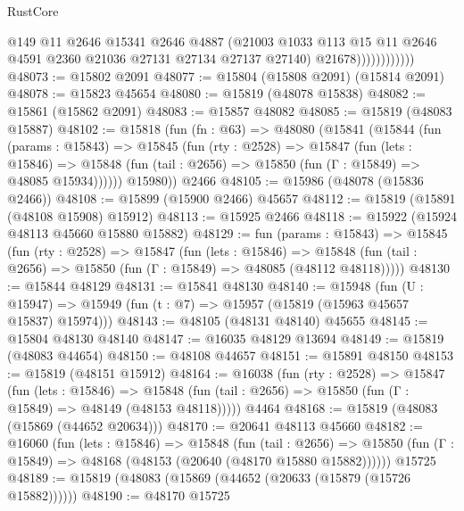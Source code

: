 \begin{lexlean}{RustCore}
\begin{coremodule}
                            @149
                            @11
                            @2646
                            @15341
                            @2646
                            @4887
                            (@21003
                              @1033
                              @113
                              @15
                              @11
                              @2646
                              @4591
                              @2360
                              @21036
                              @27131
                              @27134
                              @27137
                              @27140)
                            @21678))))))))))))
@48073 := @15802 @2091
@48077 := @15804 (@15808 @2091) (@15814 @2091)
@48078 := @15823 @45654
@48080 := @15819 (@48078 @15838)
@48082 := @15861 (@15862 @2091)
@48083 := @15857 @48082
@48085 := @15819 (@48083 @15887)
@48102 := @15818
    (fun (fn : @63) =>
    @48080
      (@15841
        (@15844
          (fun (params : @15843) =>
          @15845
            (fun (rty : @2528) =>
            @15847
              (fun (lets : @15846) =>
              @15848 (fun (tail : @2656) => @15850 (fun (Γ : @15849) => @48085 @15934))))))
        @15980))
    @2466
@48105 := @15986 (@48078 (@15836 @2466))
@48108 := @15899 (@15900 @2466) @45657
@48112 := @15819 (@15891 (@48108 @15908) @15912)
@48113 := @15925 @2466
@48118 := @15922 (@15924 @48113 @45660 @15880 @15882)
@48129 := fun (params : @15843) =>
  @15845
    (fun (rty : @2528) =>
    @15847
      (fun (lets : @15846) =>
      @15848 (fun (tail : @2656) => @15850 (fun (Γ : @15849) => @48085 (@48112 @48118)))))
@48130 := @15844 @48129
@48131 := @15841 @48130
@48140 := @15948
    (fun (U : @15947) => @15949 (fun (t : @7) => @15957 (@15819 (@15963 @45657 @15837) @15974)))
@48143 := @48105 (@48131 @48140) @45655
@48145 := @15804 @48130 @48140
@48147 := @16035 @48129 @13694
@48149 := @15819 (@48083 @44654)
@48150 := @48108 @44657
@48151 := @15891 @48150
@48153 := @15819 (@48151 @15912)
@48164 := @16038
    (fun (rty : @2528) =>
    @15847
      (fun (lets : @15846) =>
      @15848 (fun (tail : @2656) => @15850 (fun (Γ : @15849) => @48149 (@48153 @48118)))))
    @4464
@48168 := @15819 (@48083 (@15869 (@44652 @20634)))
@48170 := @20641 @48113 @45660
@48182 := @16060
    (fun (lets : @15846) =>
    @15848
      (fun (tail : @2656) =>
      @15850 (fun (Γ : @15849) => @48168 (@48153 (@20640 (@48170 @15880 @15882))))))
    @15725
@48189 := @15819 (@48083 (@15869 (@44652 (@20633 (@15879 (@15726 @15882))))))
@48190 := @48170 @15725

\end{coremodule}
\end{lexlean}
